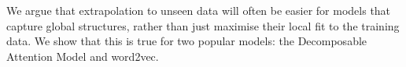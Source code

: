 We argue that extrapolation to unseen data will often be easier for models that capture global structures, rather than just maximise their local fit to the training data. We show that this is true for two popular models: the Decomposable Attention Model and word2vec.
